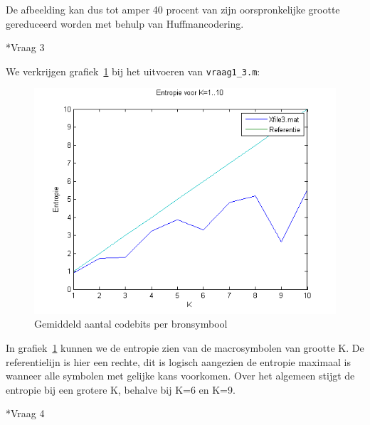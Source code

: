 \documentclass[]{article}
\begin{document}
\begin{section}
\begin{subsection}
        De afbeelding kan dus tot amper 40 procent van zijn
        oorspronkelijke grootte gereduceerd worden met behulp van
        Huffmancodering.

    \end{subsection}

    \begin{subsection}*{Vraag 3}

        We verkrijgen grafiek~\ref{fig:vraag1_3} bij het uitvoeren van \texttt{vraag1\_3.m}:

        \begin{figure}[h]
            \centering
            \includegraphics[width=\textwidth]{vraag1_3.png}
            \caption{Gemiddeld aantal codebits per bronsymbool}
            \label{fig:vraag1_3}
        \end{figure}

        In grafiek~\ref{fig:vraag1_3} kunnen we de entropie zien van de macrosymbolen van
        grootte K. De referentielijn is hier een rechte, dit is logisch
        aangezien de entropie maximaal is wanneer alle symbolen met
        gelijke kans voorkomen.
        Over het algemeen stijgt de entropie bij een grotere K, behalve
        bij K=6 en K=9.

    \end{subsection}

    \begin{subsection}*{Vraag 4}


\end{subsection}
\end{section}
\end{document}

